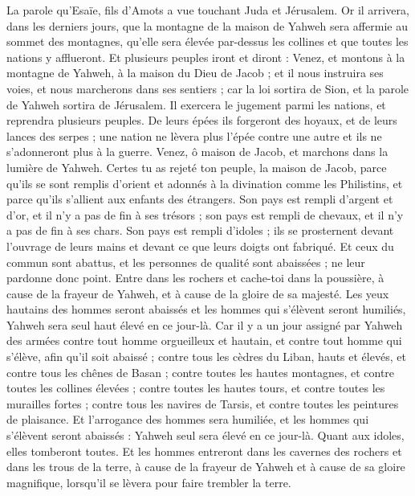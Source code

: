 \begin{multicols}{2}
\VerseOne{}La parole qu'Esaïe, fils d'Amots a vue touchant Juda et Jérusalem.
Or il arrivera, dans les derniers jours, que la montagne de la maison de Yahweh sera affermie au sommet des montagnes, qu'elle sera élevée par-dessus les collines et que toutes les nations y afflueront.
Et plusieurs peuples iront et diront : Venez, et montons à la montagne de Yahweh, à la maison du Dieu de Jacob ; et il nous instruira ses voies, et nous marcherons dans ses sentiers ; car la loi sortira de Sion, et la parole de Yahweh sortira de Jérusalem. 
Il exercera le jugement parmi les nations, et reprendra plusieurs peuples. De leurs épées ils forgeront des hoyaux, et de leurs lances des serpes ; une nation ne lèvera plus l'épée contre une autre et ils ne s'adonneront plus à la guerre.
Venez, ô maison de Jacob, et marchons dans la lumière de Yahweh.
Certes tu as rejeté ton peuple, la maison de Jacob, parce qu'ils se sont remplis d'orient et adonnés à la divination comme les Philistins, et parce qu'ils s'allient aux enfants des étrangers.
Son pays est rempli d'argent et d'or, et il n'y a pas de fin à ses trésors ; son pays est rempli de chevaux, et il n'y a pas de fin à ses chars.
Son pays est rempli d'idoles ; ils se prosternent devant l'ouvrage de leurs mains et devant ce que leurs doigts ont fabriqué.
Et ceux du commun sont abattus, et les personnes de qualité sont abaissées ; ne leur pardonne donc point.
Entre dans les rochers et cache-toi dans la poussière, à cause de la frayeur de Yahweh, et à cause de la gloire de sa majesté.
Les yeux hautains des hommes seront abaissés et les hommes qui s'élèvent seront humiliés, Yahweh sera seul haut élevé en ce jour-là.
Car il y a un jour assigné par Yahweh des armées contre tout homme orgueilleux et hautain, et contre tout homme qui s'élève, afin qu'il soit abaissé ;
contre tous les cèdres du Liban, hauts et élevés, et contre tous les chênes de Basan ;
contre toutes les hautes montagnes, et contre toutes les collines élevées ;
contre toutes les hautes tours, et contre toutes les murailles fortes ;
contre tous les navires de Tarsis, et contre toutes les peintures de plaisance.
Et l'arrogance des hommes sera humiliée, et les hommes qui s'élèvent seront abaissés :
Yahweh seul sera élevé en ce jour-là. Quant aux idoles, elles tomberont toutes.
Et les hommes entreront dans les cavernes des rochers et dans les trous de la terre, à cause de la frayeur de Yahweh et à cause de sa gloire magnifique, lorsqu'il se lèvera pour faire trembler la terre.

\end{multicols}
